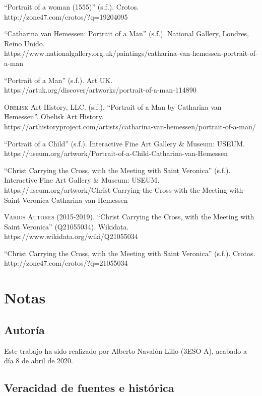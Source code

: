 \documentclass[12pt]{book}
\begin{document}
``Portrait of a woman (1555)'' (s.f.). Crotos.\\
http://zone47.com/crotos/?q=19204095\bigskip

``Catharina van Hemessen: Portrait of a Man'' (s.f.). National Gallery, Londres, Reino Unido.\\
https://www.nationalgallery.org.uk/paintings/catharina-van-hemessen-portrait-of-a-man\bigskip

``Portrait of a Man'' (s.f.). Art UK.\\
https://artuk.org/discover/artworks/portrait-of-a-man-114890\bigskip

\textsc{Obelisk} Art History, LLC. (s.f.). ``Portrait of a Man by Catharina van Hemessen''. Obelisk Art History.\\
https://arthistoryproject.com/artists/catharina-van-hemessen/portrait-of-a-man/\bigskip

``Portrait of a Child'' (s.f.). Interactive Fine Art Gallery \& Museum: USEUM.\\
https://useum.org/artwork/Portrait-of-a-Child-Catharina-van-Hemessen\bigskip

``Christ Carrying the Cross, with the Meeting with Saint Veronica'' (s.f.). Interactive Fine Art Gallery \& Museum: USEUM.\\
https://useum.org/artwork/Christ-Carrying-the-Cross-with-the-Meeting-with-Saint-Veronica-Catharina-van-Hemessen\bigskip

\textsc{Varios Autores} (2015-2019). ``Christ Carrying the Cross, with the Meeting with Saint Veronica'' (Q21055034). Wikidata.\\
https://www.wikidata.org/wiki/Q21055034\bigskip

``Christ Carrying the Cross, with the Meeting with Saint Veronica'' (s.f.). Crotos.\\
http://zone47.com/crotos/?q=21055034

\chapter{Notas}

\section{Autoría}

Este trabajo ha sido realizado por Alberto Navalón Lillo (3ESO A), acabado a día 8 de abril de 2020.

\section{Veracidad de fuentes e histórica}
\end{document}

